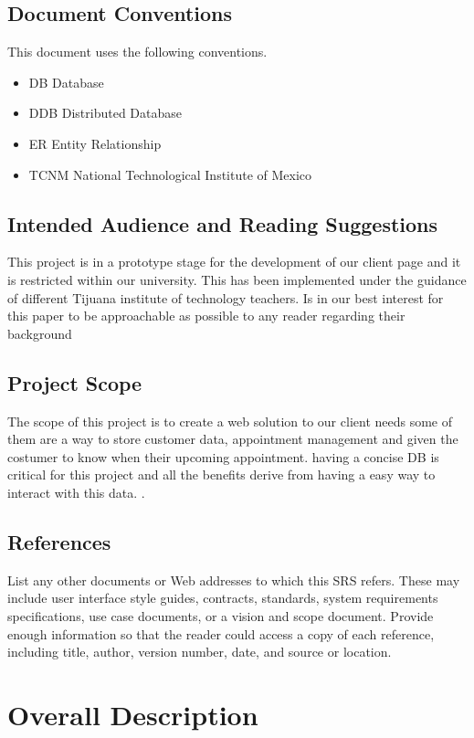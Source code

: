 \documentclass{scrreprt}
\begin{document}
	\section{Document Conventions}
	This document uses the following conventions.
	\begin{itemize}
\item		DB 		Database
\item		DDB		Distributed Database
\item		ER 		Entity Relationship
\item		TCNM	National Technological Institute of Mexico
	\end{itemize}
	\section{Intended Audience and Reading Suggestions}
	This project is in a prototype stage for the development of our client page and it is restricted within our university. This has been implemented under the guidance of different Tijuana institute of technology  teachers. Is in our best interest for this paper to be approachable as possible to any reader regarding their background
	
	\section{Project Scope}
	The scope of this project is to create a web solution to our client needs some of them are a way to store customer data, appointment management and given the costumer to know when their upcoming appointment.
	having a concise DB is critical for this project and all the benefits derive from having a easy way to interact with this data.
	.
	
	\section{References}
	List any other documents or Web addresses to which this SRS refers. These may 
	include user interface style guides, contracts, standards, system requirements 
	specifications, use case documents, or a vision and scope document. Provide 
	enough information so that the reader could access a copy of each reference, 
	including title, author, version number, date, and source or location.
	
	
	\chapter{Overall Description}
	
\end{document}
